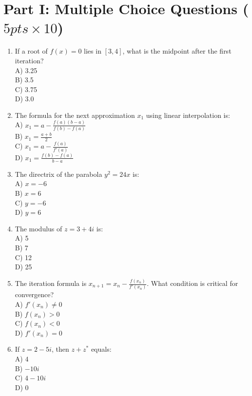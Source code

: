 \documentclass[12pt]{article}
\begin{document}
\section*{Part I: Multiple Choice Questions ($5pts\times 10$)}
\begin{enumerate}
\item 
If a root of $ f(x) = 0 $ lies in $[3, 4]$, what is the midpoint after the first iteration?\\
A) 3.25\\
B) 3.5\\
C) 3.75\\
D) 3.0

\item 
The formula for the next approximation $ x_1 $ using linear interpolation is:\\
A) $ x_1 = a - \frac{f(a)(b-a)}{f(b)-f(a)} $\\
B) $ x_1 = \frac{a + b}{2} $\\
C) $ x_1 = a - \frac{f(a)}{f'(a)} $\\
D) $ x_1 = \frac{f(b) - f(a)}{b - a} $

\item 
The directrix of the parabola $ y^2 = 24x $ is:\\
A) $ x = -6 $\\
B) $ x = 6 $\\
C) $ y = -6 $\\
D) $ y = 6 $

\item  
The modulus of $ z = 3 + 4i $ is:\\
A) 5\\
B) 7\\
C) 12\\
D) 25

\item 
The iteration formula is $ x_{n+1} = x_n - \frac{f(x_n)}{f'(x_n)} $. What condition is critical for convergence?\\
A) $ f'(x_n) \neq 0 $\\
B) $ f(x_n) > 0 $\\
C) $ f(x_n) < 0 $\\
D) $ f'(x_n) = 0 $

\item 
If $ z = 2 - 5i $, then $ z + z^* $ equals:\\
A) $ 4 $\\
B) $ -10i $\\
C) $ 4 - 10i $\\
D) $ 0 $


\end{enumerate}
\end{document}
